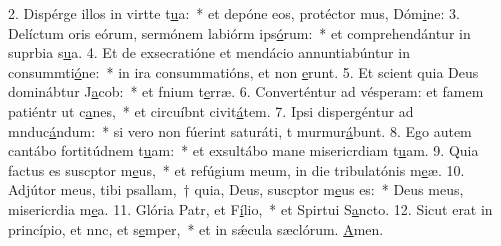 2. Dispérge illos in virtte t\uline{u}a:~* et depóne eos, protéctor mus, Dóm\uline{i}ne:
3. Delíctum oris eórum, sermónem labiórm ips\uline{ó}rum:~* et comprehendántur in suprbia s\uline{u}a.
4. Et de exsecratióne et mendácio annuntiabúntur in consummti\uline{ó}ne:~* in ira consummatións, et non \uline{e}runt.
5. Et scient quia Deus dominábtur J\uline{a}cob:~* et fnium t\uline{e}rræ.
6. Converténtur ad vésperam: et famem patiéntr ut c\uline{a}nes,~* et circuíbnt civit\uline{á}tem.
7. Ipsi dispergéntur ad mnduc\uline{á}ndum:~* si vero non fúerint saturáti, t murmur\uline{á}bunt.
8. Ego autem cantábo fortitúdnem t\uline{u}am:~* et exsultábo mane misericrdiam t\uline{u}am.
9. Quia factus es suscptor m\uline{e}us,~* et refúgium meum, in die tribulatónis m\uline{e}æ.
10. Adjútor meus, tibi psallam,~† quia, Deus, suscptor m\uline{e}us es:~* Deus meus, misericrdia m\uline{e}a.
11. Glória Patr, et F\uline{í}lio,~* et Spirtui S\uline{a}ncto.
12. Sicut erat in princípio, et nnc, et s\uline{e}mper,~* et in sǽcula sæclórum. \uline{A}men.
